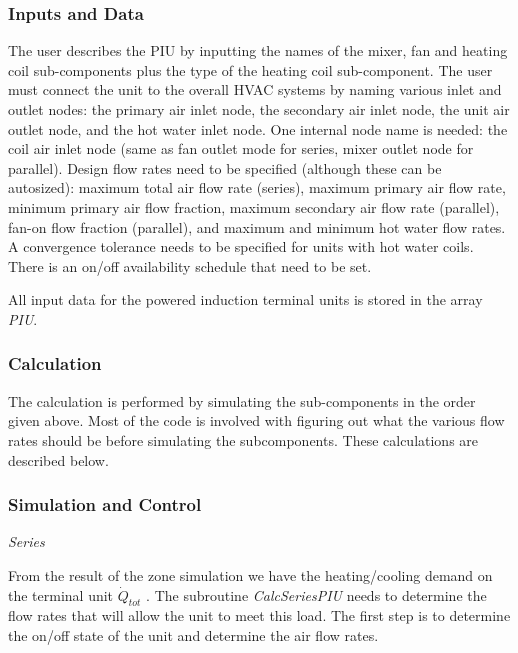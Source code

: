\subsubsection{Inputs and Data}\label{inputs-and-data-1}

The user describes the PIU by inputting the names of the mixer, fan and heating coil sub-components plus the type of the heating coil sub-component. The user must connect the unit to the overall HVAC systems by naming various inlet and outlet nodes: the primary air inlet node, the secondary air inlet node, the unit air outlet node, and the hot water inlet node. One internal node name is needed: the coil air inlet node (same as fan outlet mode for series, mixer outlet node for parallel). Design flow rates need to be specified (although these can be autosized): maximum total air flow rate (series), maximum primary air flow rate, minimum primary air flow fraction, maximum secondary air flow rate (parallel), fan-on flow fraction (parallel), and maximum and minimum hot water flow rates. A convergence tolerance needs to be specified for units with hot water coils. There is an on/off availability schedule that need to be set.

All input data for the powered induction terminal units is stored in the array \emph{PIU}.

\subsubsection{Calculation}\label{calculation-1}

The calculation is performed by simulating the sub-components in the order given above. Most of the code is involved with figuring out what the various flow rates should be before simulating the subcomponents. These calculations are described below.

\subsubsection{Simulation and Control}\label{simulation-and-control-2}

\emph{Series}

From the result of the zone simulation we have the heating/cooling demand on the terminal unit \({\dot Q_{tot}}\) . The subroutine \emph{CalcSeriesPIU} needs to determine the flow rates that will allow the unit to meet this load. The first step is to determine the on/off state of the unit and determine the air flow rates.

